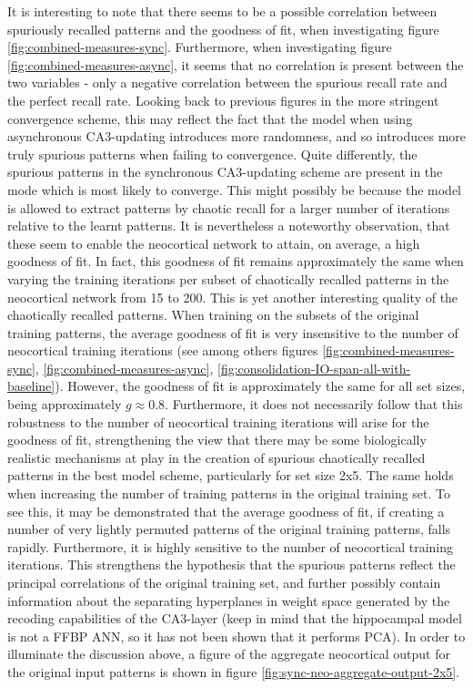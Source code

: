 It is interesting to note that there seems to be a possible correlation between spuriously recalled patterns and the goodness of fit, when investigating figure \ref{fig:combined-measures-sync}. Furthermore, when investigating figure \ref{fig:combined-measures-async}, it seems that no correlation is present between the two variables - only a negative correlation between the spurious recall rate and the perfect recall rate. Looking back to previous figures in the more stringent convergence scheme, this may reflect the fact that the model when using asynchronous CA3-updating introduces more randomness, and so introduces more truly spurious patterns when failing to convergence. Quite differently, the spurious patterns in the synchronous CA3-updating scheme are present in the mode which is most likely to converge. This might possibly be because the model is allowed to extract patterns by chaotic recall for a larger number of iterations relative to the learnt patterns. 
It is nevertheless a noteworthy observation, that these seem to enable the neocortical network to attain, on average, a high goodness of fit. In fact, this goodness of fit remains approximately the same when varying the training iterations per subset of chaotically recalled patterns in the neocortical network from 15 to 200. This is yet another interesting quality of the chaotically recalled patterns. When training on the subsets of the original training patterns, the average goodness of fit is very insensitive to the number of neocortical training iterations  (see among others figures \ref{fig:combined-measures-sync}, \ref{fig:combined-measures-async}, \ref{fig:consolidation-IO-span-all-with-baseline}). However, the goodness of fit is approximately the same for all set sizes, being approximately $g\approx 0.8$. Furthermore, it does not necessarily follow that this robustness to the number of neocortical training iterations will arise for the goodness of fit, strengthening the view that there may be some biologically realistic mechanisms at play in the creation of spurious chaotically recalled patterns in the best model scheme, particularly for set size 2x5. The same holds when increasing the number of training patterns in the original training set. To see this, it may be demonstrated that the average goodness of fit, if creating a number of very lightly permuted patterns of the original training patterns, falls rapidly. Furthermore, it is highly sensitive to the number of neocortical training iterations. This strengthens the hypothesis that the spurious patterns reflect the principal correlations of the original training set, and further possibly contain information about the separating hyperplanes in weight space generated by the recoding capabilities of the CA3-layer (keep in mind that the hippocampal model is not a FFBP ANN, so it has not been shown that it performs PCA). In order to illuminate the discussion above, a figure of the aggregate neocortical output for the original input patterns is shown in figure \ref{fig:sync-neo-aggregate-output-2x5}.

